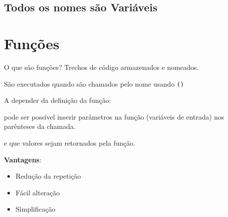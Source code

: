 	


\subsection{Todos os nomes são Variáveis}

\section{Funções}

	\begin{frame}{O que são funções?}
		Trechos de código armazenados e nomeados.
		
		São executados quando são chamados pelo nome usando \texttt{()}
		
		\vfill
		
		A depender da definição da função:
		
		
		pode ser possível inserir parâmetros na função (variáveis de entrada) nos parênteses da chamada.
		
		
		\hfill
		e que valores sejam retornados pela função. 
		
	\end{frame}
	
	\begin{frame}
		
		
		\textbf{Vantagens}:
		
			\begin{itemize}
				\item Redução da repetição  
				\item Fácil alteração 
				\item Simplificação 
			\end{itemize}
		
	\end{frame}

